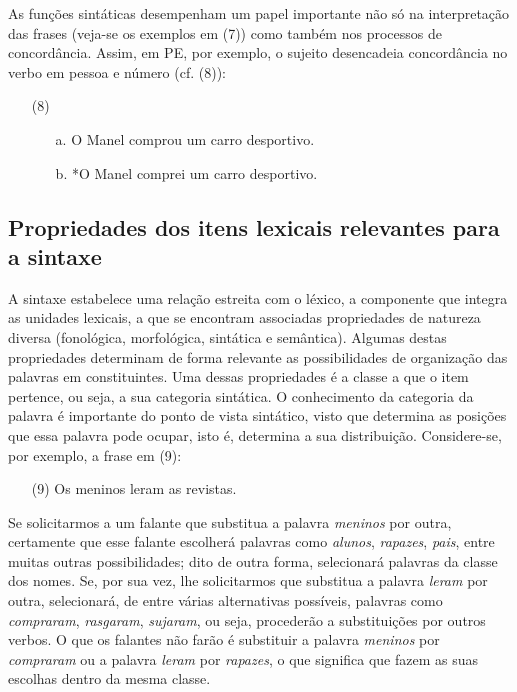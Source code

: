 \documentclass[output=paper,colorlinks,citecolor=brown,booklanguage=portuguese]{langscibook}
\begin{document}
As funções sintáticas desempenham um papel importante não só na interpretação das frases (veja-se os exemplos em (7)) como também nos processos de concordância. Assim, em PE, por exemplo, o sujeito desencadeia concordância no verbo em pessoa e número (cf. (8)):

\begin{enumerate}[align=left]
    \item [(8)]
    \begin{enumerate}
        \item [a.] O Manel comprou um carro desportivo.
     	\item[b.] *O Manel comprei um carro desportivo.
    \end{enumerate}
\end{enumerate}

\subsection{Propriedades dos itens lexicais relevantes para a sintaxe}
A sintaxe estabelece uma relação estreita com o léxico, a componente que integra as unidades lexicais, a que se encontram associadas propriedades de natureza diversa (fonológica, morfológica, sintática e semântica). Algumas destas propriedades determinam de forma relevante as possibilidades de organização das palavras em constituintes. Uma dessas propriedades é a classe a que o item pertence, ou seja, a sua categoria sintática. O conhecimento da categoria da palavra é importante do ponto de vista sintático, visto que determina as posições que essa palavra pode ocupar, isto é, determina a sua distribuição. Considere-se, por exemplo, a frase em (9):

\begin{enumerate}[align=left]
    \item [(9)] Os meninos leram as revistas.
\end{enumerate}

Se solicitarmos a um falante que substitua a palavra \emph{meninos} por outra, certamente que esse falante escolherá palavras como \emph{alunos}, \emph{rapazes}, \emph{pais}, entre muitas outras possibilidades; dito de outra forma, selecionará palavras da classe dos nomes. Se, por sua vez, lhe solicitarmos que substitua a palavra \emph{leram} por outra, selecionará, de entre várias alternativas possíveis, palavras como \emph{compraram}, \emph{rasgaram}, \emph{sujaram}, ou seja, procederão a substituições por outros verbos. O que os falantes não farão é substituir a palavra \emph{meninos} por \emph{compraram} ou a palavra \emph{leram} por \emph{rapazes}, o que significa que fazem as suas escolhas dentro da mesma classe.
\end{document}
